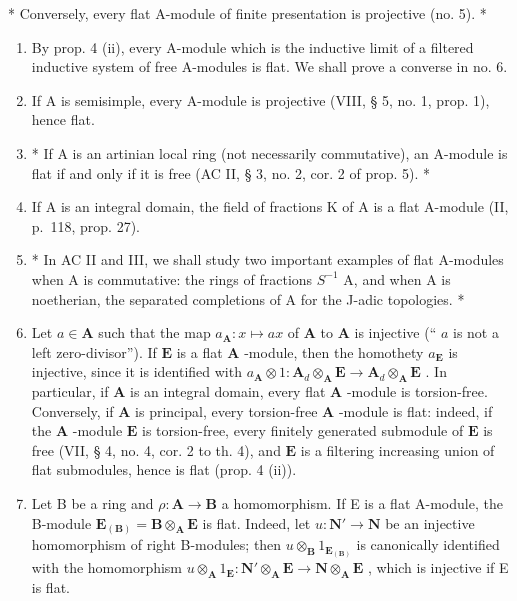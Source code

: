 * Conversely, every flat A-module of finite presentation is projective (no. 5). *

\begin{enumerate}
\def\labelenumi{\arabic{enumi})}
\setcounter{enumi}{1}
\item
  By prop. 4 (ii), every A-module which is the inductive limit of a filtered inductive system of free A-modules is flat. We shall prove a converse in no. 6.
\item
  If A is semisimple, every A-module is projective (VIII, § 5, no. 1, prop. 1), hence flat.
\item
  * If A is an artinian local ring (not necessarily commutative), an A-module is flat if and only if it is free (AC II, § 3, no. 2, cor. 2 of prop. 5). *
\item
  If A is an integral domain, the field of fractions K of A is a flat A-module (II, p.~118, prop. 27).
\item
  * In AC II and III, we shall study two important examples of flat A-modules when A is commutative: the rings of fractions \(S^{-1}\) A, and when A is noetherian, the separated completions of A for the J-adic topologies. *
\item
  Let \(a \in \mathbf{A}\) such that the map \(a_{\mathbf{A}}: x \mapsto ax\) of \(\mathbf{A}\) to \(\mathbf{A}\) is injective (“ \(a\) is not a left zero-divisor”). If \(\mathbf{E}\) is a flat \(\mathbf{A}\) -module, then the homothety \(a_{\mathbf{E}}\) is injective, since it is identified with \(a_{\mathbf{A}} \otimes 1: \mathbf{A}_{d} \otimes_{\mathbf{A}} \mathbf{E} \to \mathbf{A}_{d} \otimes_{\mathbf{A}} \mathbf{E}\) . In particular, if \(\mathbf{A}\) is an integral domain, every flat \(\mathbf{A}\) -module is torsion-free. Conversely, if \(\mathbf{A}\) is principal, every torsion-free \(\mathbf{A}\) -module is flat: indeed, if the \(\mathbf{A}\) -module \(\mathbf{E}\) is torsion-free, every finitely generated submodule of \(\mathbf{E}\) is free (VII, § 4, no. 4, cor. 2 to th. 4), and \(\mathbf{E}\) is a filtering increasing union of flat submodules, hence is flat (prop. 4 (ii)).
\item
  Let B be a ring and \(\rho: \mathbf{A} \to \mathbf{B}\) a homomorphism. If E is a flat A-module, the B-module \(\mathbf{E}_{(\mathbf{B})} = \mathbf{B} \otimes_{\mathbf{A}} \mathbf{E}\) is flat. Indeed, let \(u: \mathbf{N}' \to \mathbf{N}\) be an injective homomorphism of right B-modules; then \(u \otimes_{\mathbf{B}} 1_{\mathbf{E}_{(\mathbf{B})}}\) is canonically identified with the homomorphism \(u \otimes_{\mathbf{A}} 1_{\mathbf{E}}: \mathbf{N}' \otimes_{\mathbf{A}} \mathbf{E} \to \mathbf{N} \otimes_{\mathbf{A}} \mathbf{E}\) , which is injective if E is flat.

\end{enumerate}
